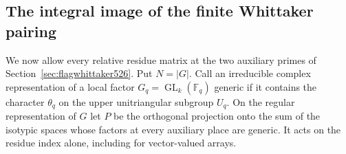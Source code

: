 \documentclass[a4paper,11pt]{article}
\theoremstyle{definition}
\theoremstyle{remark}
\numberwithin{equation}{section}
\newcommand{\GL}{\operatorname{GL}}
\begin{document}
\subsection{The integral image of the finite Whittaker pairing}
\label{sec:whittakerimage527}

We now allow every relative residue matrix at the two auxiliary
primes of Section~\ref{sec:flagwhittaker526}. Put \(N=|G|\).
Call an irreducible complex representation of a local factor
\(G_q=\GL_k(\mathbb F_q)\) generic if it contains the character
\(\theta_q\) on the upper unitriangular subgroup \(U_q\). On the
regular representation of \(G\) let \(P\) be the orthogonal
projection onto the sum of the isotypic spaces whose factors at
every auxiliary place are generic. It acts on the residue index
alone, including for vector-valued arrays.
\end{document}

